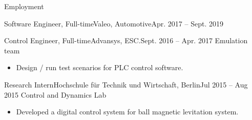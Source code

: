 \documentclass[]{mcdowellcv}
\begin{document}
\begin{cvsection}{Employment}
\begin{cvsubsection}{Software Engineer, Full-time}{Valeo, Automotive}{Apr. 2017 -- Sept. 2019}
		\end{cvsubsection}
		
		\begin{cvsubsection}{Control Engineer, Full-time}{Advansys, ESC.}{Sept. 2016 -- Apr. 2017}
			Emulation team
			\begin{itemize}
				\item Design / run test scenarios for PLC control software.
			\end{itemize}
		\end{cvsubsection}
		
		\begin{cvsubsection}{Research Intern}{Hochschule für Technik und Wirtschaft, Berlin}{Jul 2015 -- Aug 2015}
			Control and Dynamics Lab		
			\begin{itemize}
				\item Developed a digital control system for ball magnetic levitation system.
			\end{itemize}
		\end{cvsubsection}
		
	\end{cvsection}
	
\end{document}
